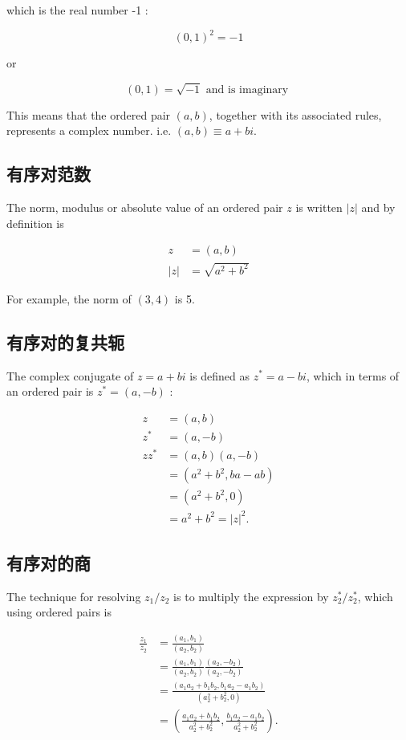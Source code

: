 which is the real number -1 :

$$
(0,1)^{2}=-1
$$

or

$$
(0,1)=\sqrt{-1} \text { and is imaginary }
$$

This means that the ordered pair $(a, b)$, together with its associated rules, represents a complex number. i.e. $(a, b) \equiv a+b i$.

\subsection{有序对范数}
The norm, modulus or absolute value of an ordered pair $z$ is written $|z|$ and by definition is

$$
\begin{aligned}
z & =(a, b) \\
|z| & =\sqrt{a^{2}+b^{2}}
\end{aligned}
$$

For example, the norm of $(3,4)$ is 5.

\subsection{有序对的复共轭}
The complex conjugate of $z=a+b i$ is defined as $z^{*}=a-b i$, which in terms of an ordered pair is $z^{*}=(a,-b)$ :

$$
\begin{aligned}
z & =(a, b) \\
z^{*} & =(a,-b) \\
z z^{*} & =(a, b)(a,-b) \\
& =\left(a^{2}+b^{2}, b a-a b\right) \\
& =\left(a^{2}+b^{2}, 0\right) \\
& =a^{2}+b^{2}=|z|^{2} .
\end{aligned}
$$

\subsection{有序对的商}
The technique for resolving $z_{1} / z_{2}$ is to multiply the expression by $z_{2}^{*} / z_{2}^{*}$, which using ordered pairs is

$$
\begin{aligned}
\frac{z_{1}}{z_{2}} & =\frac{\left(a_{1}, b_{1}\right)}{\left(a_{2}, b_{2}\right)} \\
& =\frac{\left(a_{1}, b_{1}\right)}{\left(a_{2}, b_{2}\right)} \frac{\left(a_{2},-b_{2}\right)}{\left(a_{2},-b_{2}\right)} \\
& =\frac{\left(a_{1} a_{2}+b_{1} b_{2}, b_{1} a_{2}-a_{1} b_{2}\right)}{\left(a_{2}^{2}+b_{2}^{2}, 0\right)} \\
& =\left(\frac{a_{1} a_{2}+b_{1} b_{2}}{a_{2}^{2}+b_{2}^{2}}, \frac{b_{1} a_{2}-a_{1} b_{2}}{a_{2}^{2}+b_{2}^{2}}\right) .
\end{aligned}
$$

